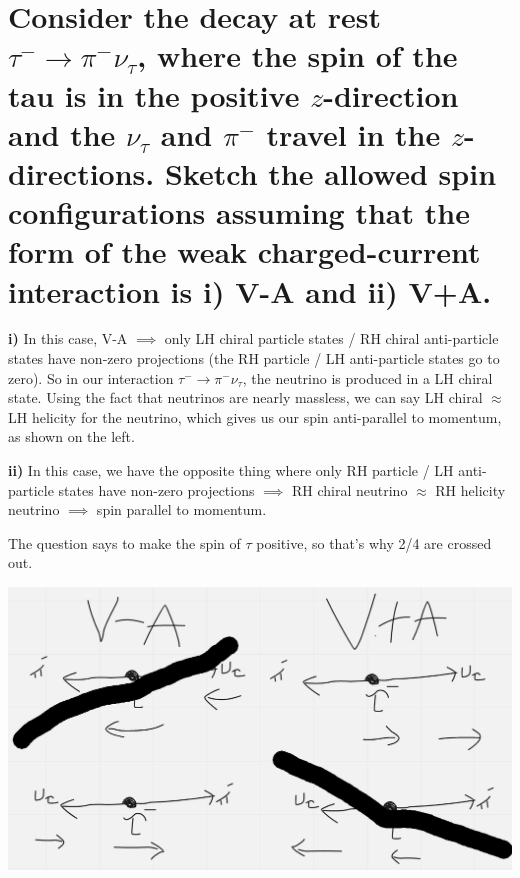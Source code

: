 \section{Consider the decay at rest \texorpdfstring{$\tau^- \to \pi^- \nu_\tau$}{tau- to pi- nu-tau}, where the spin of the tau is in the positive \texorpdfstring{$z$}{z}-direction and the \texorpdfstring{$\nu_\tau$}{nu-tau} and \texorpdfstring{$\pi^-$}{pi-} travel in the \texorpdfstring{$z$}{z}-directions. Sketch the allowed spin configurations assuming that the form of the weak charged-current interaction is i) V-A and ii) V+A.}

\textbf{i)} In this case, V-A $\implies$ only LH chiral particle states / RH chiral anti-particle states have non-zero projections (the RH particle / LH anti-particle states go to zero). So in our interaction $\tau^- \to \pi^- \nu_\tau$, the neutrino is produced in a LH chiral state. Using the fact that neutrinos are nearly massless, we can say LH chiral $\approx$ LH helicity for the neutrino, which gives us our spin anti-parallel to momentum, as shown on the left.

\textbf{ii)} In this case, we have the opposite thing where only RH particle / LH anti-particle states have non-zero projections $\implies$ RH chiral neutrino $\approx$ RH helicity neutrino $\implies$ spin parallel to momentum.

The question says to make the spin of $\tau$ positive, so that's why 2/4 are crossed out.

\begin{center}
    \includegraphics[width=\textwidth]{q1.png}
\end{center}
